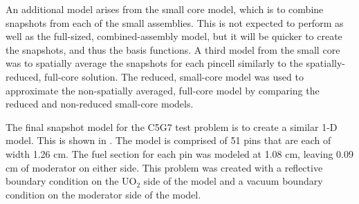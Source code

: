 An additional model arises from the small core model, which is to 
combine snapshots from each of the small assemblies.  This is not expected to 
perform as well as the full-sized, combined-assembly model, but it will be 
quicker to create the snapshots, and thus the basis functions.  A third model 
from the small core was to spatially average the snapshots for each pincell 
similarly to the spatially-reduced, full-core solution.  The reduced, small-core 
model was used to approximate the non-spatially averaged, full-core 
model by comparing the reduced and non-reduced small-core models.  

The final snapshot model for the C5G7 test problem is to create a 
similar 1-D model.  This is shown in .  The model is 
comprised of 51 pins that are each of width 1.26 cm.  The fuel section for each 
pin was modeled at 1.08 cm, leaving 0.09 cm of moderator on either side.  This 
problem was created with a reflective boundary condition on the UO$_2$ side of 
the model and a vacuum boundary condition on the moderator side of the model.

